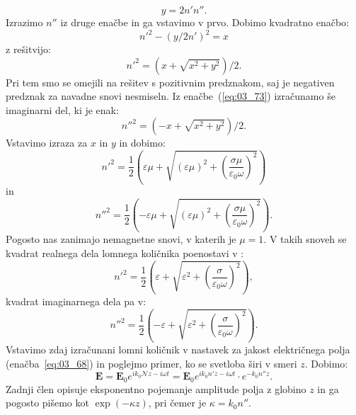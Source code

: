 \begin{equation}
y = 2n'n''.
\label{eq:03_74}
\end{equation}
Izrazimo $n''$ iz druge enačbe in ga vstavimo v prvo. Dobimo kvadratno enačbo:
\begin{equation}
n'^2-(y/2n')^2 = x
\label{eq:03_75}
\end{equation}
z rešitvijo:
\begin{equation}
n'^2 = \left(x + \sqrt{x^2+y^2}\right)/2.
\label{eq:03_76}
\end{equation}
Pri tem smo se omejili na rešitev s pozitivnim predznakom, saj je negativen predznak
za navadne snovi nesmiseln. Iz enačbe~(\ref{eq:03_73}) izračunamo še imaginarni del, 
ki je enak:
\begin{equation}
n''^2 = \left(-x + \sqrt{x^2+y^2}\right)/2.
\label{eq:03_77}
\end{equation}
Vstavimo izraza za $x$ in $y$ in dobimo:
\begin{equation}
n'^2 = \frac{1}{2}\left(\varepsilon \mu + \sqrt{(\varepsilon \mu)^2 + 
\left(\frac{\sigma \mu}{\varepsilon_0\omega}\right)^2}\right)
\label{eq:03_78}
\end{equation}
in
\begin{equation}
n''^2 = \frac{1}{2}\left(-\varepsilon \mu + \sqrt{(\varepsilon \mu)^2 + 
\left(\frac{\sigma \mu}{\varepsilon_0\omega}\right)^2}\right)\!\!.
\label{eq:03_79}
\end{equation}
Pogosto nas zanimajo nemagnetne snovi, v katerih je $\mu=1$. V takih
snoveh se kvadrat realnega dela lomnega količnika poenostavi v :
\begin{equation}
n'^2 = \frac{1}{2}\left(\varepsilon + \sqrt{\varepsilon^2 + 
\left(\frac{\sigma}{\varepsilon_0\omega}\right)^2}\right)\!\!,
\label{eq:03_80}
\end{equation}
kvadrat imaginarnega dela pa v:
\begin{equation}
n''^2 = \frac{1}{2}\left(-\varepsilon + \sqrt{\varepsilon^2 + 
\left(\frac{\sigma}{\varepsilon_0\omega}\right)^2}\right)\!\!.
\label{eq:03_81}
\end{equation}
Vstavimo zdaj izračunani lomni količnik v nastavek za jakost električnega polja 
(enačba~\ref{eq:03_68}) in poglejmo
primer, ko se svetloba širi v smeri $z$. Dobimo:
\begin{equation}
\mathbf{E} = \mathbf{E}_0 e^{ik_0\mathcal{N}z - i\omega t} = 
\mathbf{E}_0 e^{ik_0 n'z - i\omega t} \cdot e^{-k_0n''z}.
\label{eq:03_82}
\end{equation}
Zadnji člen opisuje eksponentno pojemanje amplitude polja z globino $z$ in ga pogosto
pišemo kot $\exp(-\kappa z)$, pri čemer je $\kappa = k_0 n''$.

